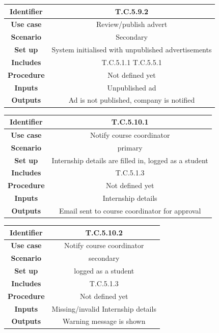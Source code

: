 \documentclass{l3deliverable}
\begin{document}
\begin{tabular}{|c|c|}
\hline \textbf{Identifier} & T.C.5.9.2\\
\hline \textbf{Use case} & Review/publish advert\\
\hline \textbf{Scenario} & Secondary\\
\hline \textbf{Set up} & System initialised with unpublished advertisements\\
\hline \textbf{Includes} & T.C.5.1.1 T.C.5.5.1\\
\hline \textbf{Procedure} & Not defined yet\\
\hline \textbf{Inputs} & Unpublished ad\\
\hline \textbf{Outputs} & Ad is not published, company is notified\\
\hline
\end{tabular}

\begin{tabular}{|c|c|}
\hline \textbf{Identifier} & T.C.5.10.1\\
\hline \textbf{Use case} & Notify course coordinator\\
\hline \textbf{Scenario} & primary\\
\hline \textbf{Set up} & Internship details are filled in, logged as a student\\
\hline \textbf{Includes} & T.C.5.1.3\\
\hline \textbf{Procedure} & Not defined yet\\
\hline \textbf{Inputs} & Internship details\\
\hline \textbf{Outputs} & Email sent to course coordinator for approval\\
\hline
\end{tabular}

\begin{tabular}{|c|c|}
\hline \textbf{Identifier} & T.C.5.10.2\\
\hline \textbf{Use case} & Notify course coordinator\\
\hline \textbf{Scenario} & secondary\\
\hline \textbf{Set up} & logged as a student\\
\hline \textbf{Includes} & T.C.5.1.3\\
\hline \textbf{Procedure} & Not defined yet\\
\hline \textbf{Inputs} & Missing/invalid Internship details\\
\hline \textbf{Outputs} & Warning message is shown\\
\hline
\end{tabular}
\end{document}

